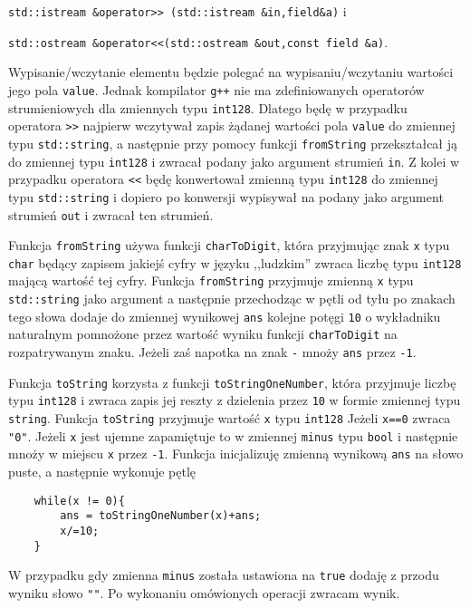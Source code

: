 \documentclass{article}
\begin{document}
\texttt{std::istream \&operator>> (std::istream \&in,field\&a)} i

\texttt{std::ostream \&operator<<(std::ostream \&out,const field \&a)}.

Wypisanie/wczytanie elementu będzie polegać na wypisaniu/wczytaniu 
wartości jego pola \texttt{value}. Jednak kompilator \texttt{g++} nie ma zdefiniowanych operatorów strumieniowych 
dla zmiennych typu \texttt{\textunderscore \textunderscore int128}. Dlatego będę w przypadku operatora \texttt{>>} najpierw
wczytywał zapis żądanej wartości pola \texttt{value} do zmiennej typu \texttt{std::string}, a następnie przy pomocy funkcji 
\texttt{fromString} przekształcał ją do zmiennej typu \texttt{\textunderscore \textunderscore int128} i zwracał podany 
jako argument strumień \texttt{in}. Z kolei w przypadku operatora \texttt{<<} będę konwertował zmienną typu 
\texttt{\textunderscore \textunderscore int128} do zmiennej typu \texttt{std::string} i dopiero po konwersji
wypisywał na podany jako argument strumień \texttt{out} i zwracał ten strumień.

Funkcja \texttt{fromString} używa funkcji \texttt{charToDigit}, która przyjmując znak \texttt{x} typu 
\texttt{char} będący zapisem jakiejś cyfry w języku ,,ludzkim'' zwraca liczbę typu 
\texttt{\textunderscore \textunderscore int128} mającą wartość tej cyfry. Funkcja \texttt{fromString} przyjmuje 
zmienną \texttt{x} typu \texttt{std::string} jako argument a następnie przechodząc w pętli od tyłu
po znakach tego słowa
dodaje do zmiennej wynikowej \texttt{ans} kolejne potęgi \texttt{10} o wykładniku naturalnym pomnożone przez wartość
wyniku funkcji \texttt{charToDigit} na rozpatrywanym znaku. Jeżeli zaś napotka na znak \texttt{-} mnoży \texttt{ans}
przez \texttt{-1}.

Funkcja \texttt{toString} korzysta z funkcji \texttt{toStringOneNumber}, która przyjmuje liczbę typu \texttt{\textunderscore \textunderscore int128}
i zwraca zapis jej reszty z dzielenia przez \texttt{10} w formie zmiennej typu \texttt{string}.
Funkcja \texttt{toString} 
przyjmuje wartość \texttt{x} typu \texttt{\textunderscore \textunderscore int128}
Jeżeli \texttt{x==0} zwraca \texttt{"0"}. Jeżeli \texttt{x} jest ujemne zapamiętuje to w zmiennej
\texttt{minus} typu \texttt{bool} i następnie mnoży w miejscu \texttt{x} przez \texttt{-1}. 
Funkcja inicjalizuję zmienną wynikową \texttt{ans} na słowo puste, a następnie wykonuje pętlę
\begin{lstlisting}
    while(x != 0){
		ans = toStringOneNumber(x)+ans;
		x/=10;
	}
\end{lstlisting}
W przypadku gdy zmienna \texttt{minus} została ustawiona na \texttt{true} dodaję z przodu wyniku słowo \texttt{"\textminus"}.
Po wykonaniu omówionych operacji zwracam wynik. 
\end{document}

